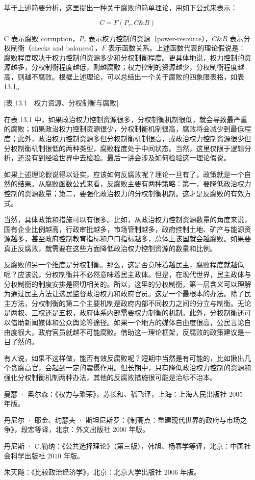 基于上述简要分析，这里提出一种关于腐败的简单理论，用如下公式来表示：

\[C = F(P_r, C\&B)\]

C 表示腐败 corruption，$P_r$ 表示权力控制的资源（power-resource），$C\&B$ 表示分权制衡（checks and balances），$F$ 表示函数关系。上述函数代表的理论假说是：腐败程度取决于权力控制的资源多少和分权制衡程度。更具体地说，权力控制的资源越多，分权制衡程度越低，则越腐败；权力控制的资源越少，分权制衡程度越高，则越不腐败。根据上述理论，可以总结出一个关于腐败的四象限表格，如表 13.1。

[表 13.1　权力资源、分权制衡与腐败]

在表 13.1 中，如果政治权力控制资源很多，分权制衡机制很低，就会导致最严重的腐败；如果政治权力控制资源很少，分权制衡机制很高，腐败将会减少到最低程度；此外，政治权力控制资源多但分权制衡机制很高，或政治权力控制资源很少但分权制衡机制很低的两种类型，腐败程度处于中间状态。当然，这里仅限于逻辑分析，还没有到经验世界中去检验。最后一讲会涉及如何检验这一理论假说。

如果上述理论假说得以证实，应该如何反腐败呢？理论一旦有了，政策就是一个自然的结果。从腐败函数公式来看，反腐败主要有两种策略：第一，要降低政治权力控制的资源数量；第二，要强化政治权力的分权制衡机制。这才是反腐败的有效方式。

当然，具体政策和措施可以有很多。比如，从政治权力控制资源数量的角度来说，国有企业比例越高，行政审批越多，市场管制越多，政府控制土地、矿产与能源资源越多，甚至政府控制教育指标和户口指标越多，总体上该国就会越腐败。如果要真正反腐败，就需要在这些方面降低政治权力控制资源的数量和比例。

反腐败的另一个维度是分权制衡。那么，这是否意味着越民主，腐败程度就越低呢？应该说，分权制衡并不必然意味着民主政体。但是，在现代世界，民主政体与分权制衡的制度安排是密切相关的。所以，这里的分权制衡，第一层含义可以理解为通过民主方法让选民监督政治权力和政府官员。这是一个最根本的办法。除了民主方法，分权制衡的第二个主要机制是政府内部不同权力之间的分立与制衡。无论是两权、三权还是五权，政府体系内部需要权力制衡的机制。此外，分权制衡还可以借助新闻媒体和公众舆论等途径。如果一个地方的媒体自由度很高，公民言论自由度很大，政府官员就越不可能腐败。借助这一理论框架，反腐败的政策建议是一目了然的。

有人说，如果不这样做，能否有效反腐败呢？短期中当然是有可能的，比如揪出几个贪腐高官，会起到一定的震慑作用。但长期中，只有降低政治权力控制的资源和强化分权制衡机制两种办法，其他的反腐败措施很可能是治标不治本。


曼瑟 · 奥尔森：《权力与繁荣》，苏长和、嵇飞译，上海：上海人民出版社 2005 年版。

丹尼尔 · 耶金、约瑟夫 · 斯坦尼斯罗：《制高点：重建现代世界的政府与市场之争》，段宏等译，北京：外文出版社 2000 年版。

丹尼斯 · C.勒纳：《公共选择理论》（第三版），韩旭、杨春学等译，北京：中国社会科学出版社 2010 年版。

朱天飚：《比较政治经济学》，北京：北京大学出版社 2006 年版。
